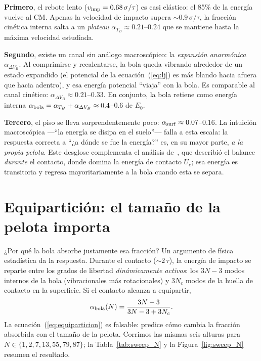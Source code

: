 \documentclass[10pt,a4paper,twocolumn]{article}
\begin{document}
\textbf{Primero}, el rebote lento ($v_{\rm imp}=0.68\,\sigma/\tau$) es
casi elástico: el 85\% de la energía vuelve al CM. Apenas la velocidad de
impacto supera $\sim0.9\,\sigma/\tau$, la fracción cinética interna salta
a un \emph{plateau} $\alpha_{T_B}\approx0.21$--$0.24$ que se mantiene
hasta la máxima velocidad estudiada.

\textbf{Segundo}, existe un canal sin análogo macroscópico: la
\emph{expansión anarmónica} $\alpha_{\Delta V_B}$. Al comprimirse y
recalentarse, la bola queda vibrando alrededor de un estado expandido
(el potencial de la ecuación~(\ref{eq:lj}) es más blando hacia afuera que
hacia adentro), y esa energía potencial ``viaja'' con la bola. Es
comparable al canal cinético: $\alpha_{\Delta V_B}\approx0.21$--$0.33$.
En conjunto, la bola retiene como energía interna
$\alpha_{\rm bola}=\alpha_{T_B}+\alpha_{\Delta V_B}\approx0.4$--$0.6$ de
$E_0$.

\textbf{Tercero}, el piso se lleva sorprendentemente poco:
$\alpha_{\rm surf}\approx0.07$--$0.16$. La intuición macroscópica ---``la
energía se disipa en el suelo''--- falla a esta escala: la respuesta
correcta a ``¿a dónde se fue la energía?'' es, en su mayor parte,
\emph{a la propia pelota}. Este desglose complementa el análisis
de~\cite{Gutierrez2012}, que describió el balance \emph{durante} el
contacto, donde domina la energía de contacto $U_c$; esa energía es
transitoria y regresa mayoritariamente a la bola cuando esta se separa.

\section{Equipartición: el tamaño de la pelota importa}
\label{sec:equiparticion}

¿Por qué la bola absorbe justamente esa fracción? Un argumento de física
estadística da la respuesta. Durante el contacto ($\sim2\,\tau$), la
energía de impacto se reparte entre los grados de libertad
\emph{dinámicamente activos}: los $3N-3$ modos internos de la bola
(vibracionales más rotacionales) y $3N_c$ modos de la huella de contacto
en la superficie. Si el contacto alcanza a equipartir,
\begin{equation}
    \alpha_{\rm bola}(N) = \frac{3N-3}{3N-3+3N_c}.
    \label{eq:equiparticion}
\end{equation}
La ecuación~(\ref{eq:equiparticion}) es falsable: predice cómo cambia la
fracción absorbida con el tamaño de la pelota. Corrimos las mismas seis
alturas para $N\in\{1,2,7,13,55,79,87\}$; la Tabla~\ref{tab:sweep_N} y la
Figura~\ref{fig:sweep_N} resumen el resultado.
\end{document}
